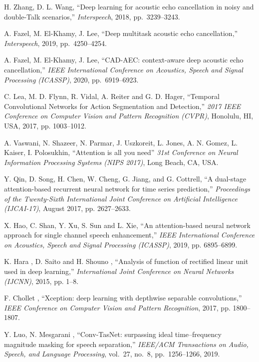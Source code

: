 \documentclass{article}
\begin{document}
\begin{sloppy}
\begin{thebibliography}{9}
   H. Zhang, D. L. Wang, ``Deep learning for acoustic echo cancellation in noisy and double-Talk scenarios,''
   \textit{Interspeech}, 2018, pp.~3239--3243.

   A. Fazel, M. El-Khamy, J. Lee, ``Deep multitask acoustic echo cancellation,''
   \textit{Interspeech}, 2019, pp.~4250--4254.

   A. Fazel, M. El-Khamy, J. Lee, ``CAD-AEC: context-aware deep acoustic echo cancellation,''
   \textit{ IEEE International Conference on Acoustics,
Speech and Signal Processing (ICASSP)}, 2020, pp.~6919--6923.

    C. Lea, M. D. Flynn, R. Vidal, A. Reiter and G. D. Hager, ``Temporal Convolutional Networks for Action Segmentation and Detection,'' \textit{2017 IEEE Conference on Computer Vision and Pattern Recognition (CVPR)}, Honolulu, HI, USA, 2017, pp. 1003--1012.

   A. Vaswani, N. Shazeer, N. Parmar, J. Uszkoreit, L. Jones, A. N. Gomez, L. Kaiser, I. Polosukhin, ``Attention is all you need'' \textit{31st Conference on Neural Information Processing Systems (NIPS 2017)}, Long Beach, CA, USA.

   Y. Qin, D. Song, H. Chen, W. Cheng, G. Jiang, and G. Cottrell, ``A dual-stage  attention-based recurrent neural network for time series prediction,'' \textit{Proceedings of the Twenty-Sixth International Joint Conference on Artificial Intelligence (IJCAI-17)}, August 2017, pp. 2627--2633.


   X. Hao, C. Shan, Y. Xu, S. Sun and L. Xie, ``An attention-based neural network approach for single channel speech enhancement,'' \textit{IEEE International Conference on Acoustics, Speech and Signal Processing (ICASSP)}, 2019, pp. 6895--6899.

    K. Hara , D. Saito and H. Shouno , ``Analysis of function of rectified linear unit used in deep learning,'' \textit{International Joint Conference on Neural Networks (IJCNN)}, 2015, pp. 1--8.

    F. Chollet , ``Xception: deep learning with depthwise separable convolutions,'' \textit{IEEE Conference on Computer Vision and Pattern Recognition}, 2017, pp. 1800--1807.

    Y. Luo, N. Mesgarani , ``Conv-TasNet: surpassing ideal time--frequency magnitude masking for speech separation,'' \textit{IEEE/ACM Transactions on Audio, Speech, and Language Processing}, vol.~27, no.~8, pp.~1256--1266, 2019.


\end{thebibliography}
\end{sloppy}
\end{document}
